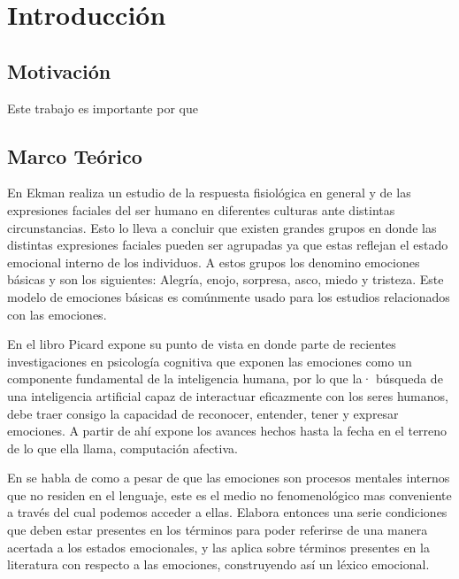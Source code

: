 \chapter{Introducción}






\section{Motivación}

Este trabajo es importante por que 



\section{Marco Teórico}

En \cite{ekman1993facial} Ekman realiza un estudio de la respuesta fisiológica en general y de las  expresiones faciales del ser humano en diferentes culturas ante distintas circunstancias. Esto lo lleva a concluir que existen grandes grupos en donde las distintas expresiones faciales pueden ser agrupadas ya que estas reflejan el estado emocional interno de los individuos. A estos grupos los denomino emociones básicas y son los siguientes: Alegría, enojo, sorpresa, asco, miedo y tristeza. Este modelo de emociones básicas es comúnmente usado para los estudios relacionados con las emociones.

En el libro \cite{picard2000affective} Picard expone su punto de vista en donde parte de recientes investigaciones en psicología cognitiva que exponen las emociones como un componente fundamental de la inteligencia humana, por lo que la· búsqueda de una inteligencia artificial capaz de interactuar eficazmente con los seres humanos, debe traer consigo la capacidad de reconocer, entender, tener y expresar emociones. A partir de ahí expone los avances hechos hasta la fecha en el terreno de lo que ella llama, computación afectiva.

En \cite{ortony1987referential} se habla de como a pesar de que las emociones son procesos mentales internos que no residen en el lenguaje, este es el medio no fenomenológico mas conveniente a través del cual podemos acceder a ellas. Elabora entonces una serie condiciones que deben estar presentes en los términos para poder referirse de una manera acertada a los estados emocionales, y las aplica sobre términos presentes en la literatura con respecto a las emociones, construyendo así un léxico emocional.


